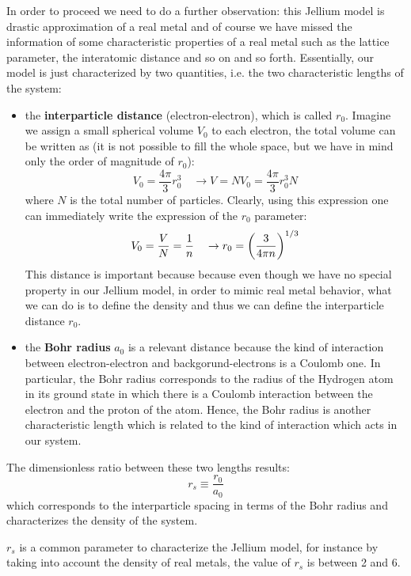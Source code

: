 \documentclass[../main/main.tex]{subfiles}
\begin{document}
In order to proceed we need to do a further observation: this Jellium model is drastic approximation of a real metal and of course we have missed the information of some characteristic properties of a real metal such as the lattice parameter, the interatomic distance and so on and so forth. Essentially, our model is just characterized by two quantities, i.e. the two characteristic lengths of the system: 
\begin{itemize}
\item the \textbf{interparticle distance} (electron-electron), which is called \( r_0 \). Imagine we assign a small spherical volume \( V_0 \) to each electron, the total volume can be written as (it is not possible to fill the whole space, but we have in mind only the order of magnitude of \( r_0 \)):
\begin{equation*}
  V_0 = \frac{4 \pi }{3} r_0^3 \quad \rightarrow V = N V_0 = \frac{4 \pi }{3} r_0^3 N
\end{equation*}
where \( N \) is the total number of particles. Clearly, using this expression one can immediately write the expression of the \( r_0 \) parameter:
\begin{equation*}
  V_0 = \frac{V}{N} = \frac{1}{n} \quad \rightarrow r_0 = \qty(\frac{3}{4 \pi n})^{1/3}
\end{equation*}
This distance is important because because even though we have no special property in our Jellium model, in order to mimic real metal behavior, what we can do is to define the density and thus we can define the interparticle distance \( r_0 \).

\item the \textbf{Bohr radius} \( a_0 \) is a relevant distance because the kind of interaction between electron-electron and backgorund-electrons is a Coulomb one.
In particular, the Bohr radius corresponds to the radius of the Hydrogen atom in its ground state in which there is a Coulomb interaction between the electron and the proton of the atom. Hence, the Bohr radius is another characteristic length which is related to the kind of interaction which acts in our system.
\end{itemize}
The dimensionless ratio between these two lengths results:
\begin{equation*}
  r_s \equiv \frac{r_0}{a_0}
\end{equation*}
which corresponds to the interparticle spacing in terms of the Bohr radius and characterizes the density of the system.
\begin{remark}
\( r_s \)  is a common parameter to characterize the Jellium model, for instance by taking into account the density of real metals, the value of \( r_s \) is between 2 and 6.
\end{remark}
\end{document}
